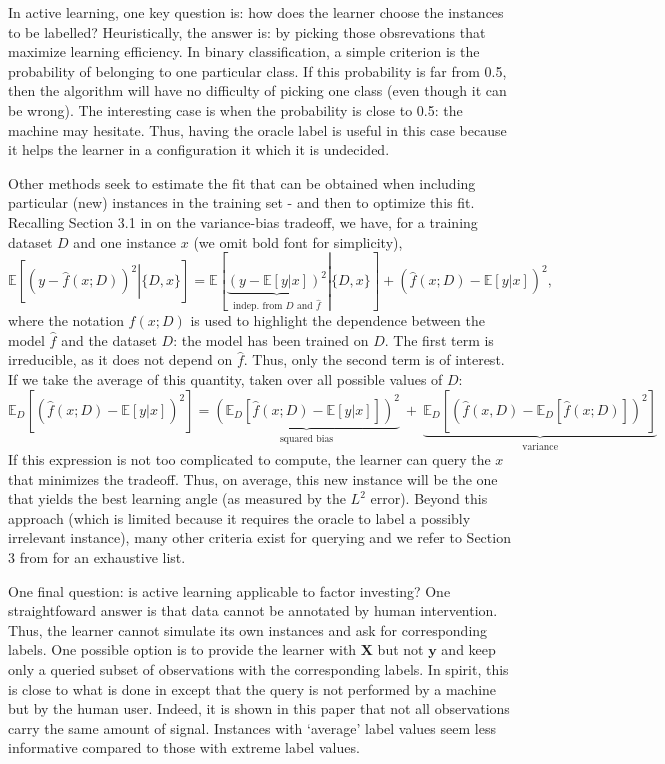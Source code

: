 \documentclass[]{krantz}
\theoremstyle{definition}
\theoremstyle{definition}
\theoremstyle{definition}
\theoremstyle{remark}
\begin{document}
In active learning, one key question is: how does the learner choose the
instances to be labelled? Heuristically, the answer is: by picking those
obsrevations that maximize learning efficiency. In binary
classification, a simple criterion is the probability of belonging to
one particular class. If this probability is far from 0.5, then the
algorithm will have no difficulty of picking one class (even though it
can be wrong). The interesting case is when the probability is close to
0.5: the machine may hesitate. Thus, having the oracle label is useful
in this case because it helps the learner in a configuration it which it
is undecided.

Other methods seek to estimate the fit that can be obtained when
including particular (new) instances in the training set - and then to
optimize this fit. Recalling Section 3.1 in \citet{geman1992neural} on
the variance-bias tradeoff, we have, for a training dataset \(D\) and
one instance \(x\) (we omit bold font for simplicity),
\[\mathbb{E}\left[\left.(y-\hat{f}(x;D))^2\right|\{D,x\}\right]=\mathbb{E}\left[\left.\underbrace{(y-\mathbb{E}[y|x])^2}_{\text{indep. from }D\text{ and }\hat{f}} \right|\{D,x\} \right]+(\hat{f}(x;D)-\mathbb{E}[y|x])^2,\]
where the notation \(f(x;D)\) is used to highlight the dependence
between the model \(\hat{f}\) and the dataset \(D\): the model has been
trained on \(D\). The first term is irreducible, as it does not depend
on \(\hat{f}\). Thus, only the second term is of interest. If we take
the average of this quantity, taken over all possible values of \(D\):
\[\mathbb{E}_D\left[(\hat{f}(x;D)-\mathbb{E}[y|x])^2  \right]=\underbrace{\left(\mathbb{E}_D\left[\hat{f}(x;D)-\mathbb{E}[y|x]\right]\right)^2}_{\text{squared bias}} \ + \ \underbrace{\mathbb{E}_D\left[(\hat{f}(x,D)-\mathbb{E}_D[\hat{f}(x;D)])^2\right]}_{\text{variance}}\]
If this expression is not too complicated to compute, the learner can
query the \(x\) that minimizes the tradeoff. Thus, on average, this new
instance will be the one that yields the best learning angle (as
measured by the \(L^2\) error). Beyond this approach (which is limited
because it requires the oracle to label a possibly irrelevant instance),
many other criteria exist for querying and we refer to Section 3 from
\citet{settles2009active} for an exhaustive list.

One final question: is active learning applicable to factor investing?
One straightfoward answer is that data cannot be annotated by human
intervention. Thus, the learner cannot simulate its own instances and
ask for corresponding labels. One possible option is to provide the
learner with \(\textbf{X}\) but not \(\textbf{y}\) and keep only a
queried subset of observations with the corresponding labels. In spirit,
this is close to what is done in \citet{coqueret2019training} except
that the query is not performed by a machine but by the human user.
Indeed, it is shown in this paper that not all observations carry the
same amount of signal. Instances with `average' label values seem less
informative compared to those with extreme label values.
\end{document}

